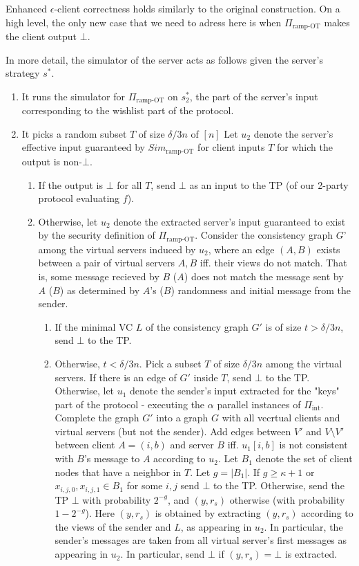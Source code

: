\documentclass[a4paper]{article}
\newcommand{\INT}{\Pi_{\text{int}}}
\begin{document}
Enhanced $\epsilon$-client correctness holds similarly to the original construction. On a high level, the only new case that we need to adress here is when $\Pi_{\text{ramp-OT}}$ makes the client output $\bot$.

In more detail, the simulator of the server acts as follows given the server's strategy $s^*$.
\begin{enumerate}
	\item It runs the simulator for $\Pi_{\text{ramp-OT}}$ on $s^*_2$, the part of the server's input corresponding to the wishlist part of the protocol.
	\item It picks a random  subset $T$ of size $\delta/3 n$ of $[n]$ Let $u_2$ denote the server's effective input guaranteed by $Sim_{\text{ramp-OT}}$ for client inputs $T$ for which the output is non-$\bot$. 
	\begin{enumerate}
	\item If the output is $\bot$ for all $T$, send $\bot$ as an input to the TP (of our 2-party protocol evaluating $f$).
	\item Otherwise, let $u_2$ denote the extracted server's input guaranteed to exist by the security definition of $\Pi_{\text{ramp-OT}}$.
	Consider the consistency graph $G$' among the virtual servers induced by $u_2$, where an edge $(A,B)$ exists between a pair of virtual servers $A,B$ iff. their views do not match. That is, some message recieved by $B$ ($A$) does not match the message sent by $A$ ($B$) as determined by $A$'s ($B$) randomness and initial message from the sender.
	\begin{enumerate}
		\item If the minimal VC $L$ of the consistency graph $G'$ is of size $t>\delta/3 n$, send $\bot$ to the TP.
		\item Otherwise, $t<\delta/3 n$. Pick a subset $T$ of size $\delta/3 n$ among the virtual servers. If there is an edge of $G'$ inside $T$, send $\bot$ to the TP. Otherwise, let $u_1$ denote the sender's input extracted for the "keys" part of the protocol - executing the $\alpha$ parallel instances of $\INT$. 
		Complete the graph $G'$ into a graph $G$ with all vecrtual clients and virtual servers (but not the sender). Add edges between $V'$ and $V\setminus{V'}$ between client $A=(i,b)$ and server $B$ iff. $u_1[i,b]$ is not consistent with $B$'s message to $A$ according to $u_2$. 
		Let $B_1$ denote the set of client nodes that have a neighbor in $T$. Let $g=|B_1|$. If $g\geq \kappa+1$ or $x_{i,j,0},x_{i,j,1}\in B_1$ for some $i,j$ send $\bot$ to the TP. Otherwise, send the TP $\bot$ with probability $2^{-g}$, and $(y,r_s)$ otherwise (with probability $1-2^{-g}$). Here $(y,r_s)$ is obtained by extracting $(y,r_s)$ according to the views of the sender and $L$, as appearing in $u_2$. In particular, the sender's messages are taken from all virtual server's first messages as appearing in $u_2$. In particular, send $\bot$ if $(y,r_s)=\bot$ is extracted.

\end{enumerate}
\end{enumerate}
\end{enumerate}
\end{document}
